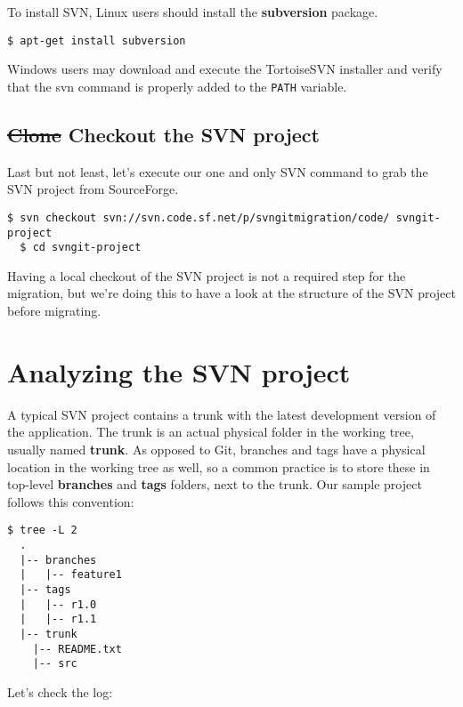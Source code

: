 \documentclass{../../common/tufte-latex/tufte-handout}
\begin{document}
To install SVN, Linux users should install the \textbf{subversion} package.

\begin{lstlisting}[style=BashInputStyle]
  $ apt-get install subversion
\end{lstlisting}

Windows users may download and execute the TortoiseSVN installer and verify that the svn command is properly added to the \texttt{PATH} variable.

\subsection{\st{Clone} Checkout the SVN project}

Last but not least, let's execute our one and only SVN command to grab the SVN project from SourceForge.

\begin{lstlisting}[style=BashInputStyle]
  $ svn checkout svn://svn.code.sf.net/p/svngitmigration/code/ svngit-project
  $ cd svngit-project
\end{lstlisting}

Having a local checkout of the SVN project is not a required step for the migration, but we're doing this to have a look at the structure of the SVN project before migrating.

\section{Analyzing the SVN project}

A typical SVN project contains a trunk with the latest development version of the application.
The trunk is an actual physical folder in the working tree, usually named \textbf{trunk}.
As opposed to Git, branches and tags have a physical location in the working tree as well, so a common practice is to store these in top-level \textbf{branches} and \textbf{tags} folders, next to the trunk.
Our sample project follows this convention:

\begin{lstlisting}[style=BashInputStyle]
  $ tree -L 2
  .
  |-- branches
  |   |-- feature1
  |-- tags
  |   |-- r1.0
  |   |-- r1.1
  |-- trunk
    |-- README.txt
    |-- src

\end{lstlisting}

Let's check the log:
\end{document}

